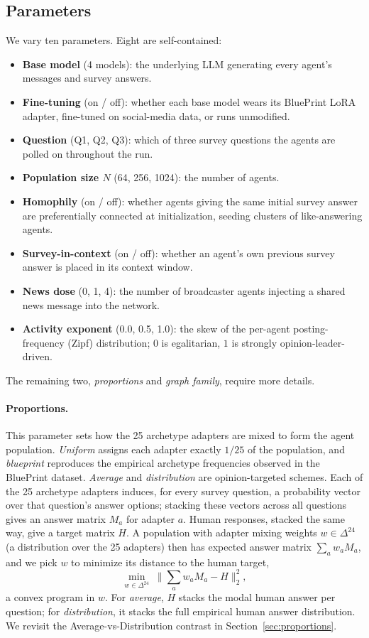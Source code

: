 \documentclass[letterpaper]{article} %
\begin{document}
\subsection{Parameters}
We vary ten parameters. Eight are self-contained:
\begin{itemize}
\setlength{\itemsep}{1pt}
\item \textbf{Base model} (4 models): the underlying LLM generating every agent's messages and survey answers.
\item \textbf{Fine-tuning} (on / off): whether each base model wears its BluePrint LoRA adapter, fine-tuned on social-media data, or runs unmodified.
\item \textbf{Question} (Q1, Q2, Q3): which of three survey questions the agents are polled on throughout the run.
\item \textbf{Population size $N$} (64, 256, 1024): the number of agents.
\item \textbf{Homophily} (on / off): whether agents giving the same initial survey answer are preferentially connected at initialization, seeding clusters of like-answering agents.
\item \textbf{Survey-in-context} (on / off): whether an agent's own previous survey answer is placed in its context window.
\item \textbf{News dose} (0, 1, 4): the number of broadcaster agents injecting a shared news message into the network.
\item \textbf{Activity exponent} (0.0, 0.5, 1.0): the skew of the per-agent posting-frequency (Zipf) distribution; $0$ is egalitarian, $1$ is strongly opinion-leader-driven.
\end{itemize}
The remaining two, \emph{proportions} and \emph{graph family}, require more details.

\paragraph{Proportions.} This parameter sets how the 25 archetype adapters are mixed to form the agent population. \emph{Uniform} assigns each adapter exactly $1/25$ of the population, and \emph{blueprint} reproduces the empirical archetype frequencies observed in the BluePrint dataset. \emph{Average} and \emph{distribution} are opinion-targeted schemes. Each of the 25 archetype adapters induces, for every survey question, a probability vector over that question's answer options; stacking these vectors across all questions gives an answer matrix $M_a$ for adapter $a$. Human responses, stacked the same way, give a target matrix $H$. A population with adapter mixing weights $w \in \Delta^{24}$ (a distribution over the 25 adapters) then has expected answer matrix $\sum_a w_a M_a$, and we pick $w$ to minimize its distance to the human target,
\begin{equation}
  \min_{w \in \Delta^{24}} \; \Big\| \textstyle\sum_a w_a M_a - H \Big\|_2^2,
\end{equation}
a convex program in $w$. For \emph{average}, $H$ stacks the modal human answer per question; for \emph{distribution}, it stacks the full empirical human answer distribution. We revisit the Average-vs-Distribution contrast in Section~\ref{sec:proportions}.
\end{document}
